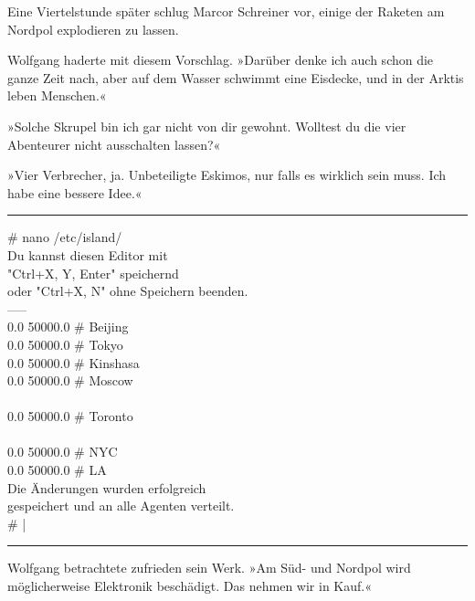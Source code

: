 Eine Viertelstunde später schlug Marcor Schreiner vor, einige der Raketen am Nordpol explodieren zu lassen.

Wolfgang haderte mit diesem Vorschlag. »Darüber denke ich auch schon die ganze Zeit nach, aber auf dem Wasser schwimmt eine Eisdecke, und in der Arktis leben Menschen.«

»Solche Skrupel bin ich gar nicht von dir gewohnt. Wolltest du die vier Abenteurer nicht ausschalten lassen?«

»Vier Verbrecher, ja. Unbeteiligte Eskimos, nur falls es wirklich sein muss. Ich habe eine bessere Idee.«

\noindent \parbox{\textwidth}{ \vspace{3ex} \hrule \vspace{3ex}

    \begin{tiny}
    \begin{ttfamily}

\noindent \# nano /etc/island/\\
\noindent Du kannst diesen Editor mit\\
\noindent "Ctrl+X, Y, Enter" speichernd\\
\noindent oder "Ctrl+X, N" ohne Speichern beenden.\\
\noindent -----\\
 0.0 50000.0 \# Beijing\\
 0.0 50000.0 \# Tokyo\\
 0.0 50000.0 \# Kinshasa\\
 0.0 50000.0 \# Moscow\\
\noindent […]\\
 0.0 50000.0 \# Toronto\\
\noindent […]\\
 0.0 50000.0 \# NYC\\
 0.0 50000.0 \# LA\\
\noindent Die Änderungen wurden erfolgreich\\
\noindent gespeichert und an alle Agenten verteilt.\\
\noindent \# |

    \end{ttfamily}
    \end{tiny}

\vspace{3ex} \hrule \vspace{3ex} }

Wolfgang betrachtete zufrieden sein Werk. »Am Süd- und Nordpol wird möglicherweise Elektronik beschädigt. Das nehmen wir in Kauf.«

